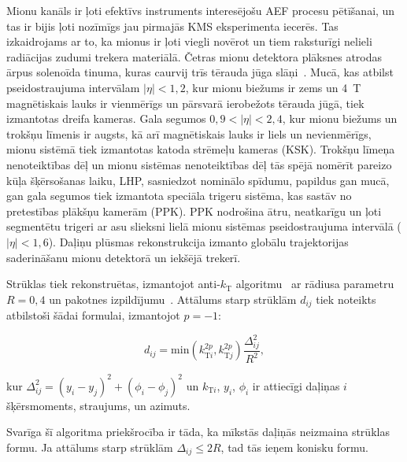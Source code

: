 Mionu kanāls ir ļoti efektīvs instruments interesējošu \gls{AEF} procesu pētīšanai, un tas ir bijis ļoti nozīmīgs jau pirmajās KMS eksperimenta iecerēs. Tas izkaidrojams ar to, ka mionus ir ļoti viegli novērot un tiem raksturīgi nelieli radiācijas zudumi trekera materiālā. Četras mionu detektora plāksnes atrodas ārpus solenoīda tinuma, kuras caurvij trīs tērauda jūga slāņi~\cite{muon_tech_rep}. Mucā, kas atbilst pseidostraujuma intervālam $\left|\eta\right|<1,2$, kur mionu biežums ir zems un 4~T magnētiskais lauks ir vienmērīgs un pārsvarā ierobežots tērauda jūgā, tiek izmantotas dreifa kameras. Gala segumos $0,9<\left|\eta\right|<2,4$, kur mionu biežums un trokšņu līmenis ir augsts, kā arī magnētiskais lauks ir liels un nevienmērīgs, mionu sistēmā tiek izmantotas katoda strēmeļu kameras (KSK). Trokšņu līmeņa nenoteiktības dēļ un mionu sistēmas nenoteiktības dēļ tās spējā nomērīt pareizo kūļa šķērsošanas laiku, LHP, sasniedzot nominālo spīdumu, papildus gan mucā, gan gala segumos tiek izmantota speciāla trigeru sistēma, kas sastāv no pretestības plākšņu kamerām (PPK). PPK nodrošina ātru, neatkarīgu un ļoti segmentētu trigeri ar asu \pt slieksni lielā mionu sistēmas pseidostraujuma intervālā ($\left|\eta\right|<1,6$). Daļiņu plūsmas rekonstrukcija izmanto globālu trajektorijas saderināšanu mionu detektorā un iekšējā trekerī. 

Strūklas tiek rekonstruētas, izmantojot anti-$k_{\text{T}}$ algoritmu~\cite{Cacciari:2008gp} ar rādiusa parametru $R=0,4$ un \FASTJET pakotnes izpildījumu~\cite{Cacciari:2011ma}. Attālums starp strūklām $d_{ij}$ tiek noteikts atbilstoši šādai formulai, izmantojot $p=-1$:

\begin{equation}
d_{ij}=\text{min}(k_{\text{T}i}^{2p}, k_{\text{T}j}^{2p})\frac{\Delta_{ij}^{2}}{R^{2}},
\end{equation}

\noindent kur $\Delta_{ij}^{2}=(y_{i}-y_{j})^{2}+(\phi_{i}-\phi_{j})^{2}$ un $k_{\text{T}i}$, $y_{i}$, $\phi_{i}$ ir attiecīgi daļiņas $i$ šķērsmoments, straujums, un azimuts. 

Svarīga šī algoritma priekšrocība ir tāda, ka \gls{mīkstās} daļiņās neizmaina strūklas formu. Ja attālums starp strūklām $\Delta_{ij}\leq2R$, tad tās ieņem konisku formu. 
